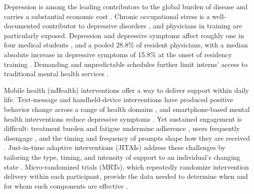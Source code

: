 \documentclass[11pt,letterpaper]{article}
\begin{document}
Depression is among the leading contributors to the global burden of disease
\cite{whiteford_global_2013, noauthor_global_2022} and carries a substantial
economic cost \cite{greenberg_economic_2015}. Chronic occupational stress is a
well-documented contributor to depressive disorders \cite{tennant_work-related_2001},
and physicians in training are particularly exposed. Depression and depressive
symptoms affect roughly one in four medical students
\cite{rotenstein_prevalence_2016, dyrbye_systematic_2006}, and a pooled 28.8\%
of resident physicians, with a median absolute increase in depressive symptoms
of 15.8\% at the onset of residency training \cite{mata_prevalence_2015}.
Demanding and unpredictable schedules further limit interns' access to
traditional mental health services \cite{necamp_assessing_2020}.

Mobile health (mHealth) interventions offer a way to deliver support within daily
life. Text-message and handheld-device interventions have produced positive
behavior change across a range of health domains
\cite{fjeldsoe_behavior_2009, de_leon_characterizing_2014, patrick_text_2009,
franklin_randomized_2006, king_promoting_2008}, and smartphone-based mental health
interventions reduce depressive symptoms \cite{firth_efficacy_2017,
linardon_efficacy_2019}. Yet sustained engagement is difficult: treatment burden
and fatigue undermine adherence \cite{heckman_treatment_2015}, users frequently
disengage \cite{zhang_factors_2017}, and the timing and frequency of prompts shape
how they are received \cite{morrison_effect_2017}. Just-in-time adaptive
interventions (JITAIs) address these challenges by tailoring the type, timing,
and intensity of support to an individual's changing state
\cite{nahum-shani_just--time_2016, heron_ecological_2010, riley_health_2011,
wang_just---moment_2019}. Micro-randomized trials (MRTs), which repeatedly
randomize intervention delivery within each participant, provide the data needed
to determine when and for whom such components are effective
\cite{qian_micro-randomized_2021, boruvka_assessing_2017}.
\end{document}
